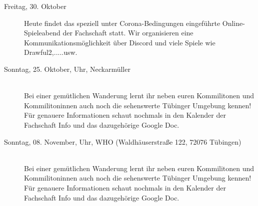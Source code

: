 \begin{description}


\item[Freitag, 30. Oktober]
	Heute findet das speziell unter Corona-Bedingungen eingeführte Online-Spieleabend der Fachschaft statt. Wir organisieren eine Kommunikationsmöglichkeit über Discord und viele Spiele wie Drawful2,.....usw.
	


\item[Sonntag, 25. Oktober,  Uhr, Neckarmüller]\ \\
        Bei einer gemütlichen Wanderung lernt ihr neben euren Kommilitonen und Kommilitoninnen auch noch die sehenswerte Tübinger Umgebung kennen! Für genauere Informationen schaut nochmals in den Kalender der Fachschaft Info und das dazugehörige Google Doc.\\
\item[Sonntag, 08. November,  Uhr, WHO (Waldhäuserstraße 122, 72076 Tübingen)]\ \\
        Bei einer gemütlichen Wanderung lernt ihr neben euren Kommilitonen und Kommilitoninnen auch noch die sehenswerte Tübinger Umgebung kennen! Für genauere Informationen schaut nochmals in den Kalender der Fachschaft Info und das dazugehörige Google Doc.\\


\end{description}
